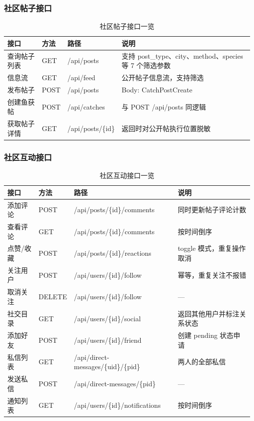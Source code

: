 \documentclass[12pt,a4paper]{ctexart}
\begin{document}
\subsubsection{社区帖子接口}

\begin{table}[H]
  \centering
  \caption{社区帖子接口一览}
  \label{tab:api-posts}
  \begin{tabular}{p{2.5cm}p{2cm}p{3cm}p{4.5cm}}
    \toprule
    \textbf{接口} & \textbf{方法} & \textbf{路径} & \textbf{说明} \\
    \midrule
    查询帖子列表 & GET & /api/posts & 支持 post\_type、city、method、species 等 7 个筛选参数 \\
    信息流 & GET & /api/feed & 公开帖子信息流，支持筛选 \\
    发布帖子 & POST & /api/posts & Body: CatchPostCreate \\
    创建鱼获帖 & POST & /api/catches & 与 POST /api/posts 同逻辑 \\
    获取帖子详情 & GET & /api/posts/\{id\} & 返回时对公开帖执行位置脱敏 \\
    \bottomrule
  \end{tabular}
\end{table}

\subsubsection{社区互动接口}

\begin{table}[H]
  \centering
  \caption{社区互动接口一览}
  \label{tab:api-community}
  \begin{tabular}{p{3cm}p{2cm}p{3.5cm}p{3.5cm}}
    \toprule
    \textbf{接口} & \textbf{方法} & \textbf{路径} & \textbf{说明} \\
    \midrule
    添加评论 & POST & /api/posts/\{id\}/comments & 同时更新帖子评论计数 \\
    查看评论 & GET & /api/posts/\{id\}/comments & 按时间倒序 \\
    点赞/收藏 & POST & /api/posts/\{id\}/reactions & toggle 模式，重复操作取消 \\
    关注用户 & POST & /api/users/\{id\}/follow & 幂等，重复关注不报错 \\
    取消关注 & DELETE & /api/users/\{id\}/follow & — \\
    社交目录 & GET & /api/users/\{id\}/social & 返回其他用户并标注关系状态 \\
    添加好友 & POST & /api/users/\{id\}/friend & 创建 pending 状态申请 \\
    私信列表 & GET & /api/direct-messages/\{uid\}/\{pid\} & 两人的全部私信 \\
    发送私信 & POST & /api/direct-messages/\{pid\} & — \\
    通知列表 & GET & /api/users/\{id\}/notifications & 按时间倒序 \\
    \bottomrule
  \end{tabular}
\end{table}
\end{document}
